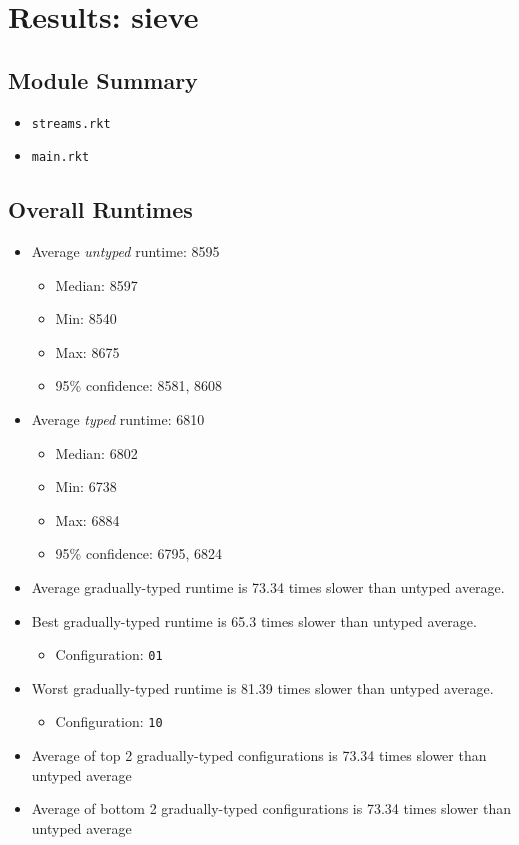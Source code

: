 \documentclass{article}
\newcommand{\mono}[1]{\texttt{#1}}
\begin{document}
\section{Results: sieve}

\subsection{Module Summary}
\begin{itemize}
\item \mono{streams.rkt}
\item \mono{main.rkt}\end{itemize}

\subsection{Overall Runtimes}
\begin{itemize}
\item Average \emph{untyped} runtime: 8595
  \begin{itemize}
  \item Median: 8597
  \item Min: 8540
  \item Max: 8675
  \item 95\% confidence: 8581, 8608
  \end{itemize}
\item Average \emph{typed} runtime: 6810
  \begin{itemize}
  \item Median: 6802
  \item Min: 6738
  \item Max: 6884
  \item 95\% confidence: 6795, 6824
  \end{itemize}
\item Average gradually-typed runtime is 73.34 times slower than untyped average.
\item Best gradually-typed runtime is 65.3 times slower than untyped average.
\begin{itemize}\item Configuration: \mono{01}\end{itemize}
\item Worst gradually-typed runtime is 81.39 times slower than untyped average.
\begin{itemize}\item Configuration: \mono{10}\end{itemize}
\item Average of top 2 gradually-typed configurations is 73.34 times slower than untyped average
\item Average of bottom 2 gradually-typed configurations is 73.34 times slower than untyped average
\end{itemize}
\end{document}
